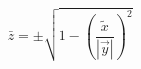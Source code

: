 \documentclass{article}
\begin{document}
\begin{equation*}
    \bar z = \pm \sqrt{1 - \left(\frac{\tilde x}{|\vec{y}|}\right)^2}
\end{equation*}
\end{document}
